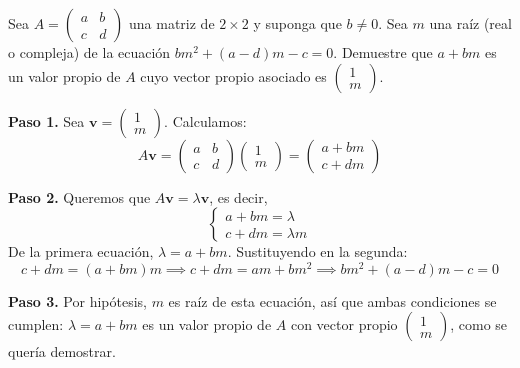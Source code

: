 \begin{prob}
Sea $A=\left(\begin{matrix} a&b \\ c&d \end{matrix}\right)$ una matriz de $2\times 2$ y suponga que $b\neq 0.$ Sea $m$ una raíz (real o compleja) de la ecuación $bm^2+(a-d)m-c=0.$  Demuestre que $a+bm$ es un valor propio de $A$ cuyo vector propio asociado es $\begin{pmatrix} 1\\m \end{pmatrix}.$
\begin{myproof}
\textbf{Paso 1.} Sea $\mathbf{v} = \begin{pmatrix} 1 \\ m \end{pmatrix}$. Calculamos:
\[
A\mathbf{v} = \begin{pmatrix} a & b \\ c & d \end{pmatrix} \begin{pmatrix} 1 \\ m \end{pmatrix}
= \begin{pmatrix} a + b m \\ c + d m \end{pmatrix}
\]

\textbf{Paso 2.} Queremos que $A\mathbf{v} = \lambda \mathbf{v}$, es decir,
\[
\begin{cases}
a + b m = \lambda \\
c + d m = \lambda m
\end{cases}
\]
De la primera ecuación, $\lambda = a + b m$. Sustituyendo en la segunda:
\[
c + d m = (a + b m)m \implies c + d m = a m + b m^2 \implies b m^2 + (a - d)m - c = 0
\]

\textbf{Paso 3.} Por hipótesis, $m$ es raíz de esta ecuación, así que ambas condiciones se cumplen: $\lambda = a + b m$ es un valor propio de $A$ con vector propio $\begin{pmatrix} 1 \\ m \end{pmatrix}$, como se quería demostrar.
\end{myproof}
\end{prob}


